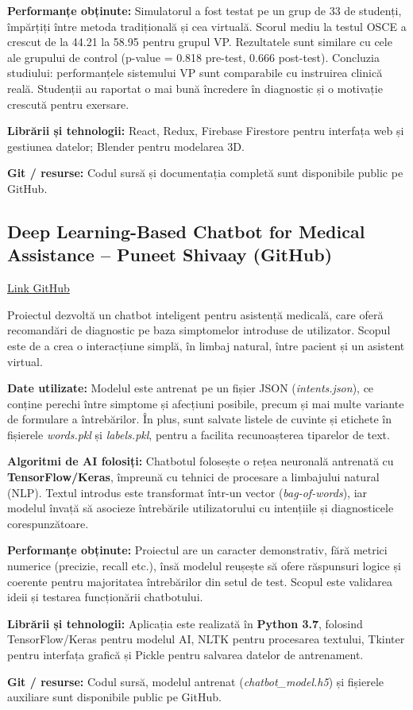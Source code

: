 \documentclass[12pt,a4paper]{article}
\begin{document}
\textbf{Performanțe obținute:}
Simulatorul a fost testat pe un grup de 33 de studenți, împărțiți între metoda tradițională și cea virtuală.  
Scorul mediu la testul OSCE a crescut de la 44.21 la 58.95 pentru grupul VP.  
Rezultatele sunt similare cu cele ale grupului de control (p-value = 0.818 pre-test, 0.666 post-test).  
Concluzia studiului: performanțele sistemului VP sunt comparabile cu instruirea clinică reală.  
Studenții au raportat o mai bună încredere în diagnostic și o motivație crescută pentru exersare.

\textbf{Librării și tehnologii:}
React, Redux, Firebase Firestore pentru interfața web și gestiunea datelor; Blender pentru modelarea 3D.

\textbf{Git / resurse:}
Codul sursă și documentația completă sunt disponibile public pe GitHub.

\subsection{Deep Learning-Based Chatbot for Medical Assistance – Puneet Shivaay (GitHub)}
\href{https://github.com/PuneetShivaay/Deep-Learning-Based-Chatbot-For-Medical-Assistance}{Link GitHub}

Proiectul dezvoltă un chatbot inteligent pentru asistență medicală, care oferă recomandări de diagnostic pe baza simptomelor introduse de utilizator.  
Scopul este de a crea o interacțiune simplă, în limbaj natural, între pacient și un asistent virtual.

\textbf{Date utilizate:}
Modelul este antrenat pe un fișier JSON (\textit{intents.json}), ce conține perechi între simptome și afecțiuni posibile, precum și mai multe variante de formulare a întrebărilor.  
În plus, sunt salvate listele de cuvinte și etichete în fișierele \textit{words.pkl} și \textit{labels.pkl}, pentru a facilita recunoașterea tiparelor de text.

\textbf{Algoritmi de AI folosiți:}
Chatbotul folosește o rețea neuronală antrenată cu \textbf{TensorFlow/Keras}, împreună cu tehnici de procesare a limbajului natural (NLP).  
Textul introdus este transformat într-un vector (\textit{bag-of-words}), iar modelul învață să asocieze întrebările utilizatorului cu intențiile și diagnosticele corespunzătoare.

\textbf{Performanțe obținute:}
Proiectul are un caracter demonstrativ, fără metrici numerice (precizie, recall etc.), însă modelul reușește să ofere răspunsuri logice și coerente pentru majoritatea întrebărilor din setul de test.  
Scopul este validarea ideii și testarea funcționării chatbotului.

\textbf{Librării și tehnologii:}
Aplicația este realizată în \textbf{Python 3.7}, folosind TensorFlow/Keras pentru modelul AI, NLTK pentru procesarea textului, Tkinter pentru interfața grafică și Pickle pentru salvarea datelor de antrenament.

\textbf{Git / resurse:}
Codul sursă, modelul antrenat (\textit{chatbot\_model.h5}) și fișierele auxiliare sunt disponibile public pe GitHub.
\end{document}
